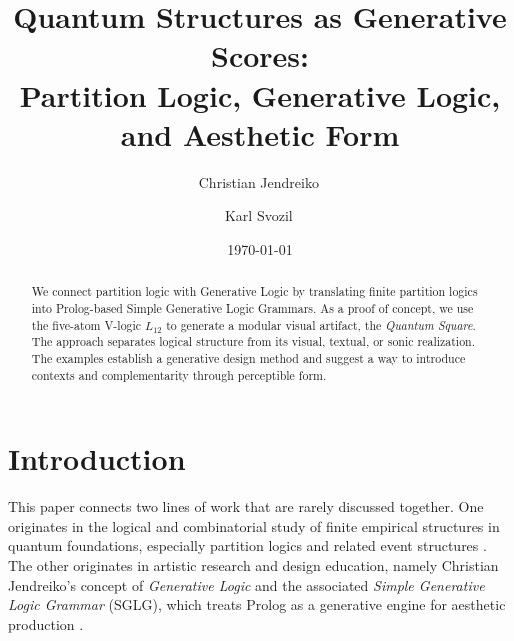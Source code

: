 \documentclass[
  10pt,
  twocolumn,
  aps,
  pra,
  showkeys,
  amsmath,amssymb,
  longbibliography
]{revtex4-2}
\begin{document}
\title{Quantum Structures as Generative Scores:\texorpdfstring{\\}{ }
Partition Logic, Generative Logic, and Aesthetic Form}

\author{Christian Jendreiko\,}
\author{Karl Svozil\,}

\date{\today}

\begin{abstract}
We connect partition logic with Generative Logic by translating finite partition logics into Prolog-based Simple Generative Logic Grammars. As a proof of concept, we use the five-atom V-logic \(L_{12}\) to generate a modular visual artifact, the \emph{Quantum Square}. The approach separates logical structure from its visual, textual, or sonic realization. The examples establish a generative design method and suggest a way to introduce contexts and complementarity through perceptible form.
\end{abstract}


\maketitle

\section{Introduction}

This paper connects two lines of work that are rarely discussed together. One originates in the logical and combinatorial study of finite empirical structures in quantum foundations, especially partition logics and related event structures \cite{svozil-93,schaller-92,dvur-pul-svo,svozil-ql,svozil-2001-eua}. The other originates in artistic research and design education, namely Christian Jendreiko's concept of \emph{Generative Logic} and the associated \emph{Simple Generative Logic Grammar} (SGLG), which treats Prolog as a generative engine for aesthetic production \cite{Jendreiko2024,Jendreiko2025}.
\end{document}
